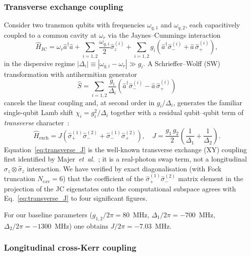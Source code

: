 \subsubsection{Transverse exchange coupling}
\label{subsec:transverse_J}

Consider two transmon qubits with frequencies $\omega_{q,1}$ and $\omega_{q,2}$,
each capacitively coupled to a common cavity at $\omega_r$ via the
Jaynes--Cummings interaction
\begin{equation}
\hat{H}_{\text{JC}} = \omega_r \hat{a}^{\dagger}\hat{a}
+ \sum_{i=1,2}\frac{\omega_{q,i}}{2}\hat{\sigma}_z^{(i)}
+ \sum_{i=1,2} g_i\!\left(\hat{a}^{\dagger}\hat{\sigma}_-^{(i)}
+ \hat{a}\,\hat{\sigma}_+^{(i)}\right) ,
\label{eq:JC_2qubit}
\end{equation}
in the dispersive regime $|\Delta_i| \equiv |\omega_{q,i} - \omega_r| \gg g_i$.
A Schrieffer--Wolff (SW) transformation with antihermitian generator
\begin{equation}
\hat{S} = \sum_{i=1,2}\frac{g_i}{\Delta_i}
\!\left(\hat{a}^{\dagger}\hat{\sigma}_-^{(i)}
- \hat{a}\,\hat{\sigma}_+^{(i)}\right)
\end{equation}
cancels the linear coupling and, at second order in $g_i/\Delta_i$, generates the
familiar single-qubit Lamb shift
$\chi_i = g_i^2/\Delta_i$ together with a residual qubit--qubit term of
\emph{transverse} character~\cite{Majer2007,blais2021circuit}:
\begin{equation}
\hat{H}_{\text{exch}} = J\!\left(\hat{\sigma}_+^{(1)}\hat{\sigma}_-^{(2)}
+ \hat{\sigma}_-^{(1)}\hat{\sigma}_+^{(2)}\right),\quad
J = \frac{g_1\,g_2}{2}\!\left(\frac{1}{\Delta_1} + \frac{1}{\Delta_2}\right).
\label{eq:transverse_J}
\end{equation}
Equation~\eqref{eq:transverse_J} is the well-known transverse exchange (XY)
coupling first identified by Majer~\textit{et~al.}~\cite{Majer2007}; it is a
real-photon swap term, not a longitudinal $\hat{\sigma}_z\!\otimes\!\hat{\sigma}_z$
interaction. We have verified by exact diagonalisation (with Fock
truncation $N_{\text{cav}} = 6$) that the coefficient of the
$\hat{\sigma}_+^{(1)}\hat{\sigma}_-^{(2)}$ matrix element in the projection of
the JC eigenstates onto the computational subspace agrees with
Eq.~\eqref{eq:transverse_J} to four significant figures.

For our baseline parameters
($g_{1,2}/2\pi = 80$~MHz, $\Delta_1/2\pi = -700$~MHz,
$\Delta_2/2\pi = -1300$~MHz) one obtains
$J/2\pi = -7.03$~MHz.

\subsubsection{Longitudinal cross-Kerr coupling}
\label{subsec:longitudinal_zeta}

